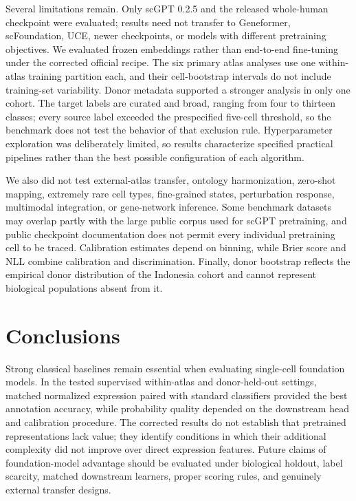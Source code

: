 Several limitations remain. Only scGPT 0.2.5 and the released whole-human checkpoint were evaluated; results need not transfer to Geneformer, scFoundation, UCE, newer checkpoints, or models with different pretraining objectives. We evaluated frozen embeddings rather than end-to-end fine-tuning under the corrected official recipe. The six primary atlas analyses use one within-atlas training partition each, and their cell-bootstrap intervals do not include training-set variability. Donor metadata supported a stronger analysis in only one cohort. The target labels are curated and broad, ranging from four to thirteen classes; every source label exceeded the prespecified five-cell threshold, so the benchmark does not test the behavior of that exclusion rule. Hyperparameter exploration was deliberately limited, so results characterize specified practical pipelines rather than the best possible configuration of each algorithm.

We also did not test external-atlas transfer, ontology harmonization, zero-shot mapping, extremely rare cell types, fine-grained states, perturbation response, multimodal integration, or gene-network inference. Some benchmark datasets may overlap partly with the large public corpus used for scGPT pretraining, and public checkpoint documentation does not permit every individual pretraining cell to be traced. Calibration estimates depend on binning, while Brier score and NLL combine calibration and discrimination. Finally, donor bootstrap reflects the empirical donor distribution of the Indonesia cohort and cannot represent biological populations absent from it.

\section{Conclusions}

Strong classical baselines remain essential when evaluating single-cell foundation models. In the tested supervised within-atlas and donor-held-out settings, matched normalized expression paired with standard classifiers provided the best annotation accuracy, while probability quality depended on the downstream head and calibration procedure. The corrected results do not establish that pretrained representations lack value; they identify conditions in which their additional complexity did not improve over direct expression features. Future claims of foundation-model advantage should be evaluated under biological holdout, label scarcity, matched downstream learners, proper scoring rules, and genuinely external transfer designs.
